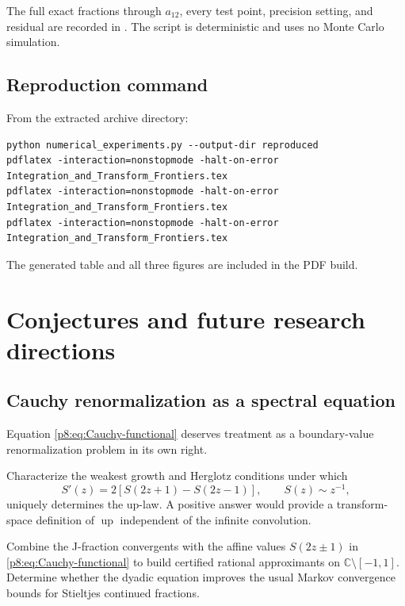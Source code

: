 \documentclass[11pt,oneside]{article}
\theoremstyle{definition}
\theoremstyle{remark}
\newcommand{\Up}{\operatorname{up}}
\newcommand{\C}{\mathbb C}
\newcommand{\1}{\mathbf 1}
\begin{document}
The full exact fractions through \(a_{12}\), every test point, precision
setting, and residual are recorded in .  The
script is deterministic and uses no Monte Carlo simulation.

\subsection{Reproduction command}

From the extracted archive directory:
\begin{lstlisting}[style=reportcode]
python numerical_experiments.py --output-dir reproduced
pdflatex -interaction=nonstopmode -halt-on-error Integration_and_Transform_Frontiers.tex
pdflatex -interaction=nonstopmode -halt-on-error Integration_and_Transform_Frontiers.tex
pdflatex -interaction=nonstopmode -halt-on-error Integration_and_Transform_Frontiers.tex
\end{lstlisting}
The generated table  and all three figures are
included in the PDF build.

\section{Conjectures and future research directions}
\label{p8:sec:future}

\subsection{Cauchy renormalization as a spectral equation}

Equation \eqref{p8:eq:Cauchy-functional} deserves treatment as a boundary-value
renormalization problem in its own right.

\begin{problem}
Characterize the weakest growth and Herglotz conditions under which
\[
 S'(z)=2[S(2z+1)-S(2z-1)],\qquad S(z)\sim z^{-1},
\]
uniquely determines the up-law.  A positive answer would provide a transform-
space definition of \(\Up\) independent of the infinite convolution.
\end{problem}

\begin{problem}
Combine the J-fraction convergents with the affine values
\(S(2z\pm1)\) in \eqref{p8:eq:Cauchy-functional} to build certified rational
approximants on \(\C\setminus[-1,1]\).  Determine whether the dyadic equation
improves the usual Markov convergence bounds for Stieltjes continued fractions.
\end{problem}
\end{document}
